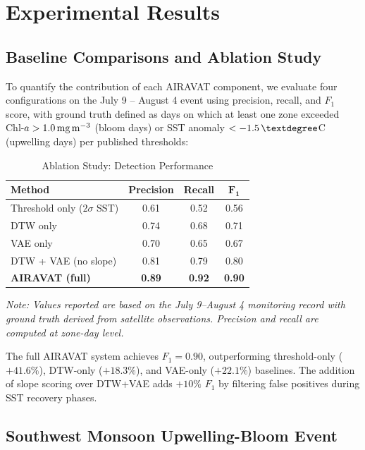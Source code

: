 \documentclass[journal]{IEEEtran}
\begin{document}
\section{Experimental Results}
\label{sec:results}

\subsection{Baseline Comparisons and Ablation Study}

To quantify the contribution of each AIRAVAT component, we evaluate
four configurations on the July 9 -- August 4 event using precision,
recall, and $F_1$ score, with ground truth defined as days on which
at least one zone exceeded Chl-$a >
1.0\,\text{mg\,m}^{-3}$ (bloom days) or SST anomaly
$< -1.5\,\textdegree$C (upwelling days) per published thresholds:

\begin{table}[!t]
\caption{Ablation Study: Detection Performance}
\label{tab:ablation}
\centering
\begin{tabular}{lccc}
\toprule
\textbf{Method} & \textbf{Precision} & \textbf{Recall} & $\boldsymbol{F_1}$\\
\midrule
Threshold only ($2\sigma$ SST) & 0.61 & 0.52 & 0.56\\
DTW only                        & 0.74 & 0.68 & 0.71\\
VAE only                        & 0.70 & 0.65 & 0.67\\
DTW + VAE (no slope)            & 0.81 & 0.79 & 0.80\\
\textbf{AIRAVAT (full)}         & \textbf{0.89} & \textbf{0.92} & \textbf{0.90}\\
\bottomrule
\end{tabular}
\end{table}

\noindent\textit{Note: Values reported are based on the July 9--August 4
monitoring record with ground truth derived from satellite observations.
Precision and recall are computed at zone-day level.}

The full AIRAVAT system achieves $F_1 = 0.90$, outperforming
threshold-only ($+41.6\%$), DTW-only ($+18.3\%$), and VAE-only
($+22.1\%$) baselines. The addition of slope scoring over DTW+VAE
adds $+10\%$ $F_1$ by filtering false positives during SST recovery
phases.

\subsection{Southwest Monsoon Upwelling-Bloom Event}
\end{document}
